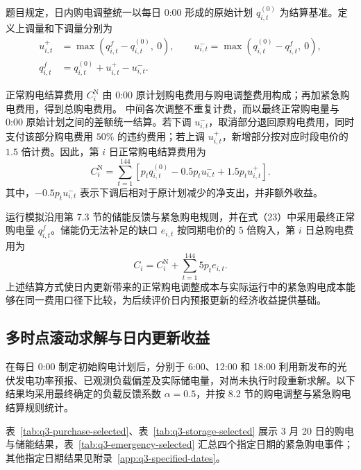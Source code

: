 \documentclass[12pt,a4paper]{ctexart}
\begin{document}
\par\noindent\hspace*{2em}题目规定，日内购电调整统一以每日 0:00 形成的原始计划 $q_{i,t}^{(0)}$ 为结算基准。定义上调量和下调量分别为
\begin{equation}
\begin{aligned}
u_{i,t}^{+}&=\max\!\left(q_{i,t}^{f}-q_{i,t}^{(0)},\ 0\right),\qquad u_{i,t}^{-}=\max\!\left(q_{i,t}^{(0)}-q_{i,t}^{f},\ 0\right),\\
q_{i,t}^{f}&=q_{i,t}^{(0)}+u_{i,t}^{+}-u_{i,t}^{-}.
\end{aligned}
\end{equation}

\par\noindent 正常购电结算费用 $C_i^{\mathrm N}$ 由 0:00 原计划购电费用与购电调整费用构成；再加紧急购电费用，得到总购电费用。
中间各次调整不重复计费，而以最终正常购电量与 0:00 原始计划之间的差额统一结算。若下调 $u_{i,t}^{-}$，取消部分退回原购电费用，同时支付该部分购电费用 $50\%$ 的违约费用；若上调 $u_{i,t}^{+}$，新增部分按对应时段电价的 $1.5$ 倍计费。因此，第 $i$ 日正常购电结算费用为
\begin{equation}
C_i^{\mathrm N}=\sum_{t=1}^{144}\left[p_tq_{i,t}^{(0)}-0.5p_tu_{i,t}^{-}+1.5p_tu_{i,t}^{+}\right].
\end{equation}
其中，$-0.5p_tu_{i,t}^{-}$ 表示下调后相对于原计划减少的净支出，并非额外收益。

\par\noindent\hspace*{2em}运行模拟沿用第 7.3 节的储能反馈与紧急购电规则，并在式（23）中采用最终正常购电量 $q_{i,t}^{f}$。储能仍无法补足的缺口 $e_{i,t}$ 按同期电价的 5 倍购入，第 $i$ 日总购电费用为
\begin{equation}
C_i=C_i^{\mathrm N}+\sum_{t=1}^{144}5p_te_{i,t}.
\end{equation}
上述结算方式使日内更新带来的正常购电调整成本与实际运行中的紧急购电成本能够在同一费用口径下比较，为后续评价日内预报更新的经济收益提供基础。
\subsection{多时点滚动求解与日内更新收益}
在每日 0:00 制定初始购电计划后，分别于 6:00、12:00 和 18:00 利用新发布的光伏发电功率预报、已观测负载偏差及实际储电量，对尚未执行时段重新求解。以下结果均采用最终确定的负载反馈系数 $\alpha=0.5$，并按 8.2 节的购电调整与紧急购电结算规则统计。

\par\noindent\hspace*{2em}表~\ref{tab:q3-purchase-selected}、表~\ref{tab:q3-storage-selected} 展示 3 月 20 日的购电与储能结果，表~\ref{tab:q3-emergency-selected} 汇总四个指定日期的紧急购电事件；其他指定日期结果见附录~\ref{app:q3-specified-dates}。
\end{document}
